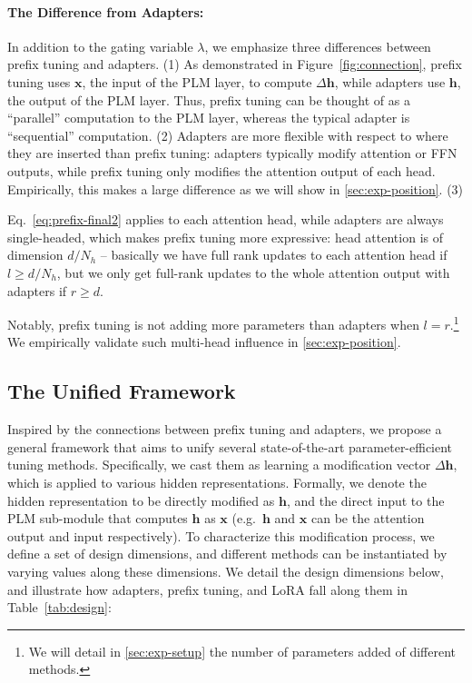 \paragraph{The Difference from Adapters:} In addition to the gating variable $\lambda$, we emphasize three differences between prefix tuning and adapters. (1) As demonstrated in Figure~\ref{fig:connection}, prefix tuning uses ${\bm{x}}$, the input of the PLM layer, to compute $\Delta {\bm{h}}$, while adapters use ${\bm{h}}$, the output of the PLM layer. Thus, prefix tuning can be thought of as a ``parallel'' computation to the PLM layer, whereas the typical adapter is ``sequential'' computation. (2) Adapters are more flexible with respect to where they are inserted than prefix tuning: adapters typically modify attention or FFN outputs, while prefix tuning only modifies the attention output of each head. Empirically, this makes a large difference as we will show in \textsection\ref{sec:exp-position}.
(3)

Eq.~\ref{eq:prefix-final2} applies to each attention head, while adapters are always single-headed, which makes prefix tuning more expressive: head attention is of dimension $d/N_h$ -- basically we have full rank updates to each attention head if $l \ge d / N_h$, but we only get full-rank updates to the whole attention output with adapters if $r \ge d$.

Notably, prefix tuning is not adding more parameters than adapters when $l=r$.\footnote{We will detail in \textsection\ref{sec:exp-setup} the number of parameters added of different methods.} We empirically validate such multi-head influence in \textsection\ref{sec:exp-position}.

\subsection{The Unified Framework}
\label{sec:unify}

Inspired by the connections between prefix tuning and adapters, we propose a general framework that aims to unify several state-of-the-art parameter-efficient tuning methods. Specifically, we cast them as learning a modification vector $\Delta {\bm{h}}$, which is applied to various hidden representations. Formally, we denote the hidden representation to be directly modified as ${\bm{h}}$, and the direct input to the PLM sub-module that computes ${\bm{h}}$ as ${\bm{x}}$ (e.g.~${\bm{h}}$ and ${\bm{x}}$ can be the attention output and input respectively). To characterize this modification process, we define a set of design dimensions, and different methods can be instantiated by varying values along these dimensions. We detail the design dimensions below, and illustrate how adapters, prefix tuning, and LoRA fall along them in Table~\ref{tab:design}:

